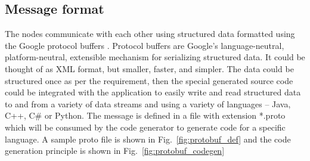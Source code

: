 \subsection{Message format}
The nodes communicate with each other using structured data formatted using the Google protocol buffers \cite{ProtocolBuffers}. Protocol buffers are Google's language-neutral, platform-neutral, extensible mechanism for serializing structured data. It could be thought of as XML format, but smaller, faster, and simpler. The data could be structured once as per the requirement, then the special generated source code could be integrated with the application to easily write and read structured data to and from a variety of data streams and using a variety of languages – Java, C++, C\# or Python. The message is defined in a file with extension *.proto which will be consumed by the code generator to generate code for a specific language. A sample proto file is shown in Fig.~\ref{fig:protobuf_def} and the code generation principle is shown in Fig.~\ref{fig:protobuf_codegen}
